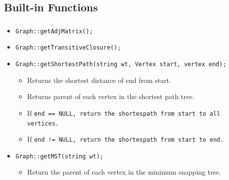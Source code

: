 \documentclass[mathserif,10pt]{beamer}
\begin{document}
\subsection{Built-in Functions}
\frame
{
  \frametitle{\subsecname}
  \begin{itemize}
    \item \tt{Graph::getAdjMatrix();}
    \item \tt{Graph::getTransitiveClosure();}
    \item \tt{Graph::getShortestPath(string wt, Vertex start, vertex end);}
    \begin{itemize}
      \item Returns the shortest distance of end from start. 
      \item Returns parent of each vertex in the shortest path tree.
      \item If \tt{end == NULL}, return the shortespath from start to all vertices.
      \item If \tt{end != NULL}, return the shortespath from start to end.
    \end{itemize} 
    \item \tt{Graph::getMST(string wt);}
    \begin{itemize}
      \item Return the parent of each vertex in the minimum snapping tree.
    \end{itemize} 
  \end{itemize}
}
\end{document}
